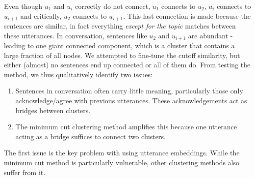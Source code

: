         Even though $u_1$ and $u_{i}$ correctly do not connect, $u_1$ connects to $u_2$, $u_{i}$ connects to $u_{i+1}$ and critically, $u_2$ connects to $u_{i+1}$. This last connection is made because the sentences are similar, in fact everything \textit{except for the topic} matches between these utterances. In conversation, sentences like $u_2$ and $u_{i+1}$ are abundant - leading to one giant connected component, which is a cluster that contains a large fraction of all nodes. We attempted to fine-tune the cutoff similarity, but either (almost) no sentences end up connected or all of them do. 
        From testing the method, we thus qualitatively identify two issues:
        \begin{enumerate}
            \item Sentences in conversation often carry little meaning, particularly those only acknowledge/agree with previous utterances. These acknowledgements act as bridges between clusters.
            \item The minimum cut clustering method amplifies this because one utterance acting as a bridge suffices to connect two clusters.
        \end{enumerate}
        
        The first issue is the key problem with using utterance embeddings. While the minimum cut method is particularly vulnerable, other clustering methods also suffer from it.
    
